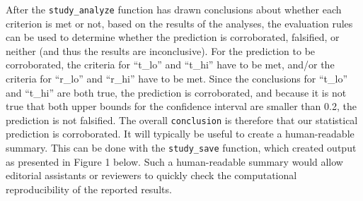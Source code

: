 \documentclass[
  english,
  doc,floatsintext]{apa6}
\begin{document}
After the \texttt{study\_analyze} function has drawn conclusions about whether each criterion is met or not, based on the results of the analyses, the evaluation rules can be used to determine whether the prediction is corroborated, falsified, or neither (and thus the results are inconclusive). For the prediction to be corroborated, the criteria for \enquote{t\_lo} and \enquote{t\_hi} have to be met, and/or the criteria for \enquote{r\_lo} and \enquote{r\_hi} have to be met. Since the conclusions for \enquote{t\_lo} and \enquote{t\_hi} are both true, the prediction is corroborated, and because it is not true that both upper bounds for the confidence interval are smaller than 0.2, the prediction is not falsified. The overall \texttt{conclusion} is therefore that our statistical prediction is corroborated. It will typically be useful to create a human-readable summary. This can be done with the \texttt{study\_save} function, which created output as presented in Figure 1 below. Such a human-readable summary would allow editorial assistants or reviewers to quickly check the computational reproducibility of the reported results.
\end{document}
